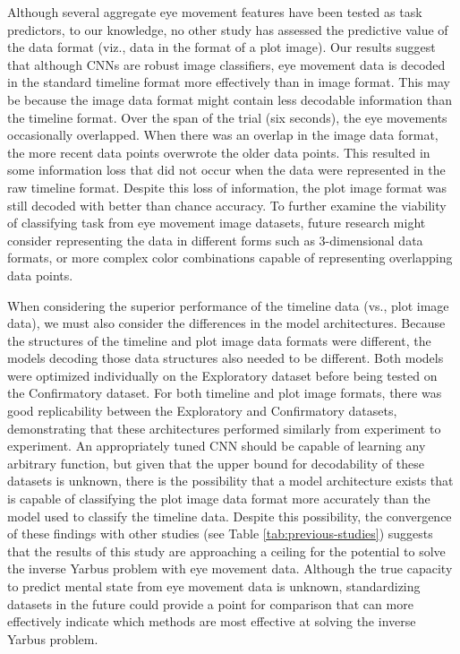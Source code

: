 \documentclass[
  english,
  man,floatsintext]{apa6}
\begin{document}
Although several aggregate eye movement features have been tested as task predictors, to our knowledge, no other study has assessed the predictive value of the data format (viz., data in the format of a plot image). Our results suggest that although CNNs are robust image classifiers, eye movement data is decoded in the standard timeline format more effectively than in image format. This may be because the image data format might contain less decodable information than the timeline format. Over the span of the trial (six seconds), the eye movements occasionally overlapped. When there was an overlap in the image data format, the more recent data points overwrote the older data points. This resulted in some information loss that did not occur when the data were represented in the raw timeline format. Despite this loss of information, the plot image format was still decoded with better than chance accuracy. To further examine the viability of classifying task from eye movement image datasets, future research might consider representing the data in different forms such as 3-dimensional data formats, or more complex color combinations capable of representing overlapping data points.

When considering the superior performance of the timeline data (vs., plot image data), we must also consider the differences in the model architectures. Because the structures of the timeline and plot image data formats were different, the models decoding those data structures also needed to be different. Both models were optimized individually on the Exploratory dataset before being tested on the Confirmatory dataset. For both timeline and plot image formats, there was good replicability between the Exploratory and Confirmatory datasets, demonstrating that these architectures performed similarly from experiment to experiment. An appropriately tuned CNN should be capable of learning any arbitrary function, but given that the upper bound for decodability of these datasets is unknown, there is the possibility that a model architecture exists that is capable of classifying the plot image data format more accurately than the model used to classify the timeline data. Despite this possibility, the convergence of these findings with other studies (see Table \ref{tab:previous-studies}) suggests that the results of this study are approaching a ceiling for the potential to solve the inverse Yarbus problem with eye movement data. Although the true capacity to predict mental state from eye movement data is unknown, standardizing datasets in the future could provide a point for comparison that can more effectively indicate which methods are most effective at solving the inverse Yarbus problem.
\end{document}
